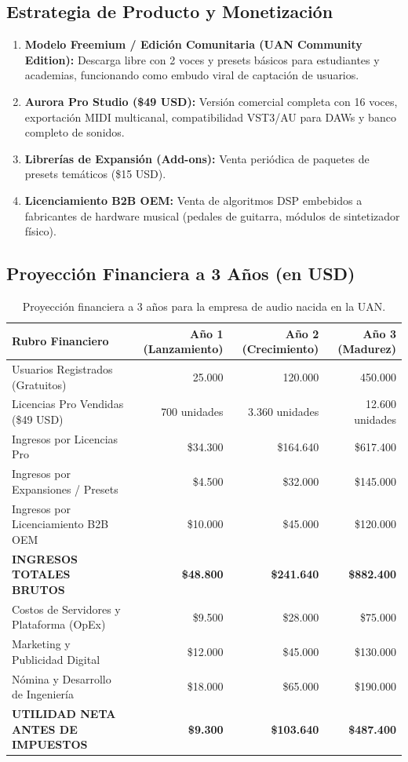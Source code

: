 \documentclass[11pt,a4paper]{article}
\begin{document}
\subsection{Estrategia de Producto y Monetización}
\begin{enumerate}
    \item \textbf{Modelo Freemium / Edición Comunitaria (UAN Community Edition):} Descarga libre con 2 voces y presets básicos para estudiantes y academias, funcionando como embudo viral de captación de usuarios.
    \item \textbf{Aurora Pro Studio (\$49 USD):} Versión comercial completa con 16 voces, exportación MIDI multicanal, compatibilidad VST3/AU para DAWs y banco completo de sonidos.
    \item \textbf{Librerías de Expansión (Add-ons):} Venta periódica de paquetes de presets temáticos (\$15 USD).
    \item \textbf{Licenciamiento B2B OEM:} Venta de algoritmos DSP embebidos a fabricantes de hardware musical (pedales de guitarra, módulos de sintetizador físico).
\end{enumerate}

\subsection{Proyección Financiera a 3 Años (en USD)}

\begin{table}[h]
\centering
\small
\begin{tabular}{@{}lrrr@{}}
\toprule
\textbf{Rubro Financiero} & \textbf{Año 1 (Lanzamiento)} & \textbf{Año 2 (Crecimiento)} & \textbf{Año 3 (Madurez)} \\ \midrule
Usuarios Registrados (Gratuitos) & 25.000 & 120.000 & 450.000 \\
Licencias Pro Vendidas (\$49 USD) & 700 unidades & 3.360 unidades & 12.600 unidades \\
Ingresos por Licencias Pro & \$34.300 & \$164.640 & \$617.400 \\
Ingresos por Expansiones / Presets & \$4.500 & \$32.000 & \$145.000 \\
Ingresos por Licenciamiento B2B OEM & \$10.000 & \$45.000 & \$120.000 \\ \midrule
\textbf{INGRESOS TOTALES BRUTOS} & \textbf{\$48.800} & \textbf{\$241.640} & \textbf{\$882.400} \\
Costos de Servidores y Plataforma (OpEx) & \$9.500 & \$28.000 & \$75.000 \\
Marketing y Publicidad Digital & \$12.000 & \$45.000 & \$130.000 \\
Nómina y Desarrollo de Ingeniería & \$18.000 & \$65.000 & \$190.000 \\ \midrule
\textbf{UTILIDAD NETA ANTES DE IMPUESTOS} & \textbf{\$9.300} & \textbf{\$103.640} & \textbf{\$487.400} \\ \bottomrule
\end{tabular}
\caption{Proyección financiera a 3 años para la empresa de audio nacida en la UAN.}
\end{table}
\end{document}
